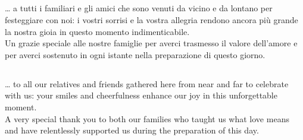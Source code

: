 \documentclass[10pt,b6paper,usenames,twoside]{article}
\newcommand\blankpage{%
    \null
    \thispagestyle{empty}%
    \addtocounter{page}{-1}%
    \newpage}
\begin{document}
\thispagestyle{empty}
\begin{flushleft} 
\section*{\textcolor{forestgreen(traditional)}{}} 

\noindent … a tutti i familiari e gli amici che sono venuti da vicino e da lontano per festeggiare con noi: i vostri sorrisi e la vostra allegria rendono ancora più grande la nostra gioia in questo momento indimenticabile.\\
\vspace*{3mm}
\noindent Un grazie speciale alle nostre famiglie per averci trasmesso il valore dell’amore e per averci sostenuto in ogni istante nella preparazione di questo giorno.
\end{flushleft}
\vfill
\begin{flushright}
\section*{\textcolor{forestgreen(traditional)}{}} 

\noindent … to all our relatives and friends gathered here from near and far to celebrate with us: your smiles and cheerfulness enhance our joy in this unforgettable moment.\\
\vspace*{3mm}
A very special thank you to both our families who taught us what love means and have relentlessly supported us during the preparation of this day.
\afterpage{\blankpage}
\end{flushright}
\end{document}
